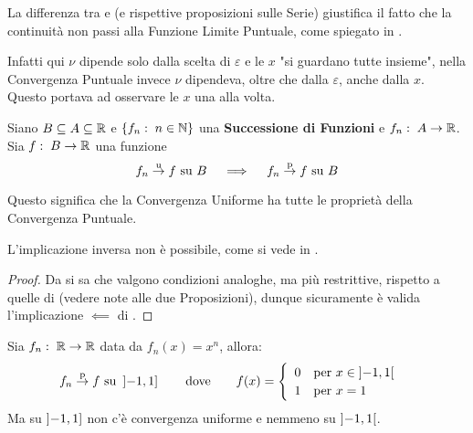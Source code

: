 \begin{observation}
	\label{obs:diff_conv_unif_e_conv_punt}
	La differenza tra  e  (e rispettive proposizioni sulle Serie) giustifica il fatto che la continuità non passi alla Funzione Limite Puntuale, come spiegato in .

	Infatti qui $\nu$ dipende solo dalla scelta di $\varepsilon$ e le $x$ "si guardano tutte insieme", nella Convergenza Puntuale invece $\nu$ dipendeva, oltre che dalla $\varepsilon$, anche dalla $x$. Questo portava ad osservare le $x$ una alla volta.
\end{observation}
\begin{corollary}
	\label{coro:if_unif_conv_then_punt_conv}
	Siano $B \subseteq A \subseteq \mathbb{R}$ e $\left\{f_n:\; n \in \mathbb{N}\right\}$ una \textbf{Successione di Funzioni} e $f_n:\; A \to \mathbb{R}$. Sia $f:\; B \to \mathbb{R}$ una funzione
	\[f_n \overset{\text{u}}{\to} f \text{ su } B \quad \implies \quad  f_n \overset{\text{p}}{\to} f \text{ su } B\]
	\vspace*{-\baselineskip}
	\begin{note}
		Questo significa che la Convergenza Uniforme ha tutte le proprietà della Convergenza Puntuale.
	\end{note}
	\begin{note}
		L'implicazione inversa non è possibile, come si vede in .
	\end{note}
	\begin{proof}
		Da   si sa che valgono condizioni analoghe, ma più restrittive, rispetto a quelle di  (vedere note alle due Proposizioni), dunque sicuramente è valida l'implicazione $\impliedby$ di .
	\end{proof}
\end{corollary}
\begin{example}
	\label{ex:conv_punt_nimplies_conv_unif}
	Sia $f_n:\; \mathbb{R} \to \mathbb{R}$ data da $f_n(x) = x^n$, allora:
	\[
		f_n \overset{\text{p}}{\to} f \text{ su } \left]-1,1\right]
		\qquad \text{dove} \qquad
		f(x) = \begin{cases}
			\begin{array}{ll}
				0 & \text{per } x \in \left]-1,1\right[\\
				1 & \text{per } x = 1
			\end{array}
		\end{cases}
	\]
	Ma su $\left]-1,1\right]$ non c'è convergenza uniforme e nemmeno su $\left]-1,1\right[$.
\end{example}
